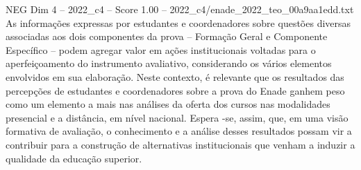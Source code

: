 \begin{textsample}{NEG Dim 4 – 2022\_c4 – Score 1.00 – 2022\_c4/enade\_2022\_teo\_00a9aa1edd.txt}
As informações expressas por estudantes e coordenadores sobre questões diversas associadas aos dois componentes da prova – Formação Geral e Componente Específico – podem agregar valor em ações institucionais voltadas para o aperfeiçoamento do instrumento avaliativo, considerando os vários elementos envolvidos em sua elaboração.
Neste contexto, é relevante que os resultados das percepções de estudantes e coordenadores sobre a prova do Enade ganhem peso como um elemento a mais nas análises da oferta dos cursos nas modalidades presencial e a distância, em nível nacional.
Espera -se, assim, que, em uma visão formativa de avaliação, o conhecimento e a análise desses resultados possam vir a contribuir para a construção de alternativas institucionais que venham a induzir a qualidade da educação superior.

\end{textsample}
